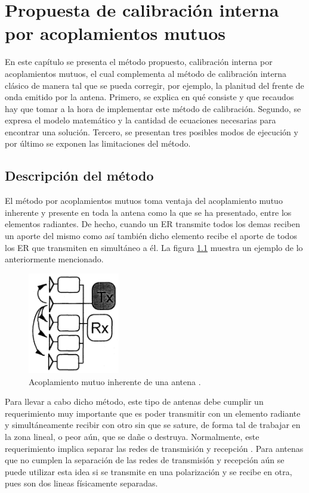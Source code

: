 \chapter{Propuesta de calibración interna por acoplamientos mutuos}
\label{ch:mutualCalibration}

En este capítulo se presenta el método propuesto, calibración interna por acoplamientos mutuos, el cual complementa al método de
calibración interna clásico de manera tal que se pueda corregir, por ejemplo, la planitud del frente de onda emitido por la
antena. Primero, se explica en qué consiste y que recaudos hay que tomar a la hora de implementar este método de calibración.
Segundo, se expresa el modelo matemático y la cantidad de ecuaciones necesarias para encontrar una solución. Tercero, se
presentan tres posibles modos de ejecución y por último se exponen las limitaciones del método.  


\section{Descripción del método}

El método por acoplamientos mutuos toma ventaja del acoplamiento mutuo inherente y presente en toda la antena como la que se ha
presentado, entre los elementos radiantes. De hecho, cuando un ER transmite todos los demas reciben un aporte del mismo como así
también dicho elemento recibe el aporte de todos los ER que transmiten en simultáneo a él. La figura \ref{fig:mutualCoupling1}
muestra un ejemplo de lo anteriormente mencionado.

\begin{figure}[H]
 \centering
 \includegraphics[width=4cm]{gfx/mutualCoupling1.png}
 \caption{Acoplamiento mutuo inherente de una antena \cite{Hara1997}.}
 \label{fig:mutualCoupling1}
\end{figure}

Para llevar a cabo dicho método, este tipo de antenas debe cumplir un requerimiento muy importante que es poder transmitir con
un elemento radiante y simultáneamente recibir con otro sin que se sature, de forma tal de trabajar en la zona lineal, o peor
aún, que se dañe o destruya. Normalmente, este requerimiento implica separar las redes de transmisión y recepción
\cite{Gao2001}. Para antenas que no cumplen la separación de las redes de transmisión y recepción aún se puede utilizar esta
idea si se transmite en una polarización y se recibe en otra, pues son dos lineas físicamente separadas.

